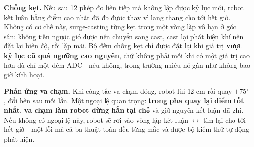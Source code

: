 \textbf{Chống kẹt.} Nếu sau 12 phép đo liên tiếp mà không lập được kỷ lục mới, robot kết luận bằng điểm cao nhất đã đo được thay vì lang thang cho tới hết giờ. Không có cơ chế này, surge-casting từng kẹt trong một vòng lặp vô hạn ở góc sân: không tiến ngược gió được nên chuyển sang cast, cast lại phát hiện khí nên đặt lại biên độ, rồi lặp mãi. Bộ đếm chống kẹt chỉ được đặt lại khi giá trị \textbf{vượt kỷ lục cũ quá ngưỡng cao nguyên}, chứ không phải mỗi khi có một giá trị cao hơn dù chỉ một đếm ADC - nếu không, trong trường nhiễu nó gần như không bao giờ kích hoạt.

\textbf{Phản ứng va chạm.} Khi công tắc va chạm đóng, robot lùi 12 cm rồi quay $\pm$75$^\circ$, đổi bên sau mỗi lần. Một ngoại lệ quan trọng: \textbf{trong pha quay lại điểm tốt nhất, va chạm làm robot dừng hẳn tại chỗ} và giữ nguyên kết luận đã ghi. Nếu không có ngoại lệ này, robot sẽ rơi vào vòng lặp kết luận $\leftrightarrow$ tìm lại cho tới hết giờ - một lỗi mà cả ba thuật toán đều từng mắc và được bộ kiểm thử tự động phát hiện.

